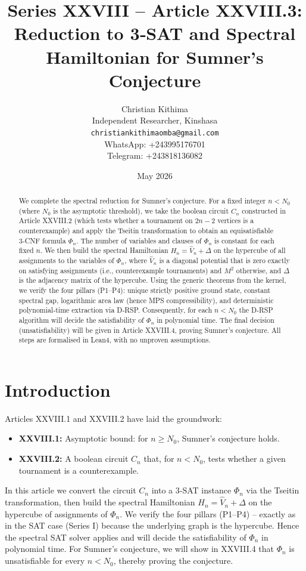 \documentclass[11pt,a4paper]{article}
\title{Series XXVIII – Article XXVIII.3: Reduction to 3‑SAT and Spectral Hamiltonian for Sumner's Conjecture}
\author{Christian Kithima \\
Independent Researcher, Kinshasa \\
\texttt{christiankithimaomba@gmail.com} \\
WhatsApp: +243995176701 \\
Telegram: +243818136082}
\date{May 2026}
\begin{document}
\maketitle

\begin{abstract}
We complete the spectral reduction for Sumner's conjecture. For a fixed integer $n < N_0$ (where $N_0$ is the asymptotic threshold), we take the boolean circuit $C_n$ constructed in Article XXVIII.2 (which tests whether a tournament on $2n-2$ vertices is a counterexample) and apply the Tseitin transformation to obtain an equisatisfiable 3‑CNF formula $\Phi_n$. The number of variables and clauses of $\Phi_n$ is constant for each fixed $n$. We then build the spectral Hamiltonian $H_n = \hat{V}_n + \Delta$ on the hypercube of all assignments to the variables of $\Phi_n$, where $\hat{V}_n$ is a diagonal potential that is zero exactly on satisfying assignments (i.e., counterexample tournaments) and $M^2$ otherwise, and $\Delta$ is the adjacency matrix of the hypercube. Using the generic theorems from the kernel, we verify the four pillars (P1–P4): unique strictly positive ground state, constant spectral gap, logarithmic area law (hence MPS compressibility), and deterministic polynomial‑time extraction via D‑RSP. Consequently, for each $n < N_0$ the D‑RSP algorithm will decide the satisfiability of $\Phi_n$ in polynomial time. The final decision (unsatisfiability) will be given in Article XXVIII.4, proving Sumner's conjecture. All steps are formalised in Lean4, with no unproven assumptions.
\end{abstract}

\tableofcontents

\section{Introduction}
Articles XXVIII.1 and XXVIII.2 have laid the groundwork:
\begin{itemize}
\item \textbf{XXVIII.1:} Asymptotic bound: for $n \ge N_0$, Sumner's conjecture holds.
\item \textbf{XXVIII.2:} A boolean circuit $C_n$ that, for $n < N_0$, tests whether a given tournament is a counterexample.
\end{itemize}
In this article we convert the circuit $C_n$ into a 3‑SAT instance $\Phi_n$ via the Tseitin transformation, then build the spectral Hamiltonian $H_n = \hat{V}_n + \Delta$ on the hypercube of assignments of $\Phi_n$. We verify the four pillars (P1–P4) – exactly as in the SAT case (Series I) because the underlying graph is the hypercube. Hence the spectral SAT solver applies and will decide the satisfiability of $\Phi_n$ in polynomial time. For Sumner's conjecture, we will show in XXVIII.4 that $\Phi_n$ is unsatisfiable for every $n < N_0$, thereby proving the conjecture.
\end{document}
